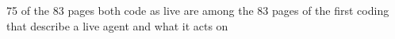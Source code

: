 75 of the 83 pages both code as live are among the 83 pages of the first coding that describe a live agent and what it acts on